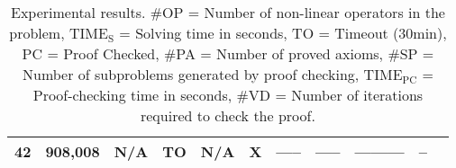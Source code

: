 \begin{table}[h]
\begin{center}
\begin{tabular}{|r||r|r|r||r||c|r|r|r|r|r|}
      \hline
       42&  908,008&       N/A&       TO&             N/A&X&  -----& -----& --------- & --\\
      \hline
    \end{tabular}
  \end{center}
  \caption{
    Experimental results.
    \#OP = Number of non-linear operators in the problem,
    $\mathrm{TIME_S}$ = Solving time in seconds,
    TO = Timeout (30min),
    PC = Proof Checked,
    \#PA = Number of proved axioms,
    \#SP = Number of subproblems generated by proof checking,
    $\mathrm{TIME_{PC}}$ = Proof-checking time in seconds,
    \#VD = Number of iterations required to check the proof.
  }\label{tbl:exp}
\end{table}
